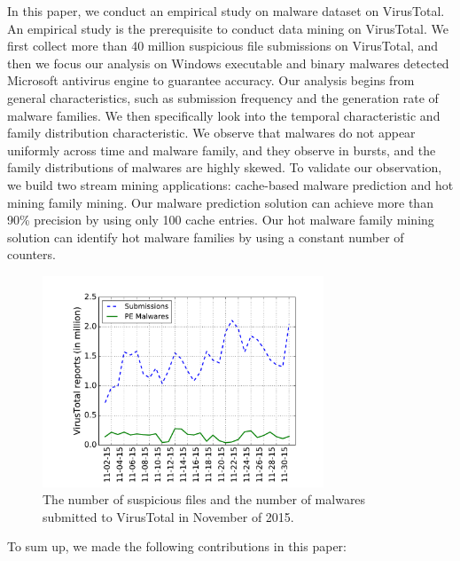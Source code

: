 In this paper, we conduct an empirical study on malware dataset on VirusTotal. 
An empirical study is the prerequisite to conduct data mining on VirusTotal. 
We first collect more than 40 million suspicious file submissions on VirusTotal, and then 
we focus our analysis on Windows executable and binary malwares detected Microsoft
antivirus engine to guarantee accuracy. 
Our analysis begins from general characteristics, such as submission frequency and the generation rate of malware families. 
We then specifically look into the temporal characteristic and family distribution characteristic. 
We observe that malwares do not appear uniformly across time and malware family, and they observe in bursts, 
and the family distributions of malwares are highly skewed. 
To validate our observation, we build two stream mining applications: cache-based malware prediction and hot mining family mining. 
Our malware prediction solution can achieve more than 90\% 
precision by using only 100 cache entries. 
Our hot malware family mining solution can identify hot malware families by using a constant number of counters. 


\begin{figure}[t!]
\begin{center}
\includegraphics[width=3.3in]{figure/nov}
\caption{The number of suspicious files and the number of malwares submitted to VirusTotal in November of 2015. }
\label{fig:subnum}
\end{center}
\end{figure}

To sum up, we made the following contributions in this paper:

